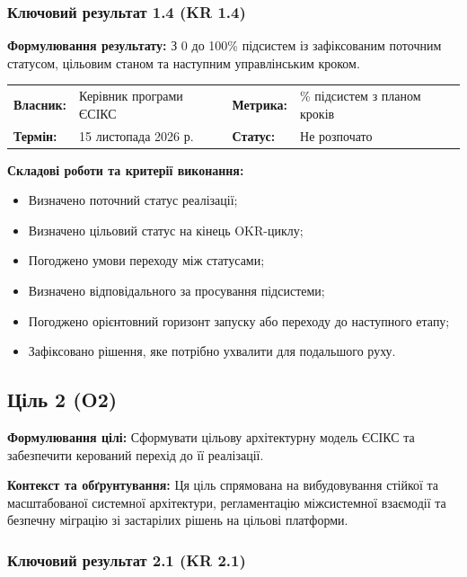 \documentclass{article}
\begin{document}
\subsubsection{Ключовий результат 1.4 (KR 1.4)}

\textbf{Формулювання результату:} З 0 до 100\% підсистем із зафіксованим поточним статусом, цільовим станом та наступним управлінським кроком.

\noindent\begin{tabular}{@{}p{2.2cm}p{4.5cm}p{2.2cm}p{4.5cm}@{}}
\toprule
\textbf{Власник:} & Керівник програми ЄСІКС & \textbf{Метрика:} & \% підсистем з планом кроків \\
\textbf{Термін:} & 15 листопада 2026 р. & \textbf{Статус:} & Не розпочато \\
\bottomrule
\end{tabular}

\vspace{10pt}
\textbf{Складові роботи та критерії виконання:}
\begin{itemize}
    \item Визначено поточний статус реалізації;
    \item Визначено цільовий статус на кінець OKR-циклу;
    \item Погоджено умови переходу між статусами;
    \item Визначено відповідального за просування підсистеми;
    \item Погоджено орієнтовний горизонт запуску або переходу до наступного етапу;
    \item Зафіксовано рішення, яке потрібно ухвалити для подальшого руху.
\end{itemize}

\newpage

\subsection{Ціль 2 (O2)}

\textbf{Формулювання цілі:} Сформувати цільову архітектурну модель ЄСІКС та забезпечити керований перехід до її реалізації.

\textbf{Контекст та обґрунтування:}
Ця ціль спрямована на вибудовування стійкої та масштабованої системної архітектури, регламентацію міжсистемної взаємодії та безпечну міграцію зі застарілих рішень на цільові платформи.

\subsubsection{Ключовий результат 2.1 (KR 2.1)}
\end{document}
